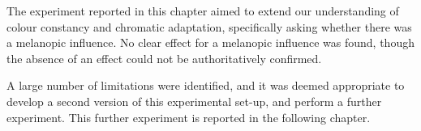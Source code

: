 The experiment reported in this chapter aimed to extend our understanding of colour constancy and chromatic adaptation, specifically asking whether there was a melanopic influence. No clear effect for a melanopic influence was found, though the absence of an effect could not be authoritatively confirmed.

A large number of limitations were identified, and it was deemed appropriate to develop a second version of this experimental set-up, and perform a further experiment. This further experiment is reported in the following chapter.










